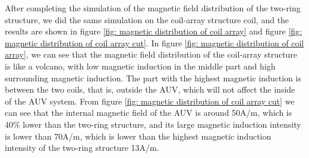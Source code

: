 After completing the simulation of the magnetic field distribution of the two-ring structure, we did the same simulation on the coil-array structure coil, and the results are shown in figure \ref{fig: magnetic distribution of coil array} and figure \ref{fig: magnetic distribution of coil array cut}.
In figure \ref{fig: magnetic distribution of coil array}, we can see that the magnetic field distribution of the coil-array structure is like a volcano, with low magnetic induction in the middle part and high surrounding magnetic induction. The part with the highest magnetic induction is between the two coils, that is, outside the AUV, which will not affect the inside of the AUV system. From figure \ref{fig: magnetic distribution of coil array cut} we can see that the internal magnetic field of the AUV is around 50A/m, which is 40\% lower than the two-ring structure, and its large magnetic induction intensity is lower than 70A/m, which is lower than the highest magnetic induction intensity of the two-ring structure 13A/m.

